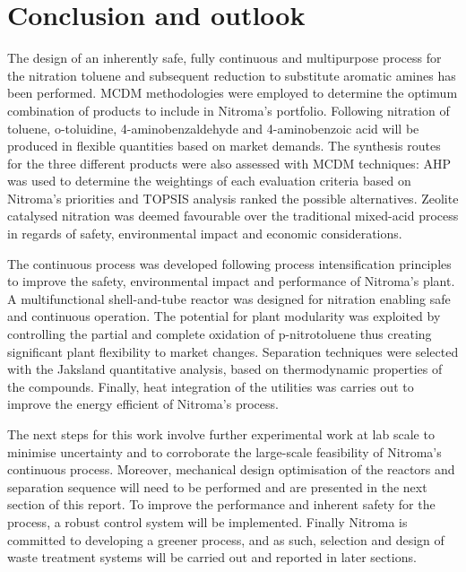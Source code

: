 \section{Conclusion and outlook}

The design of an inherently safe, fully continuous and multipurpose process for the nitration toluene and subsequent reduction to substitute aromatic amines has been performed. MCDM methodologies were employed to determine the optimum combination of products to include in Nitroma's portfolio. Following nitration of toluene, o-toluidine, 4-aminobenzaldehyde and 4-aminobenzoic acid will be produced in flexible quantities based on market demands. The synthesis routes for the three different products were also assessed with MCDM techniques: AHP was used to determine the weightings of each evaluation criteria based on Nitroma's priorities and TOPSIS analysis ranked the possible alternatives. Zeolite catalysed nitration was deemed favourable over the traditional mixed-acid process in regards of safety, environmental impact and economic considerations. 

The continuous process was developed following process intensification principles to improve the safety, environmental impact and performance of Nitroma's plant. A multifunctional shell-and-tube reactor was designed for nitration enabling safe and continuous operation. The potential for plant modularity was exploited by controlling the partial and complete oxidation of p-nitrotoluene thus creating significant plant flexibility to market changes. Separation techniques were selected with the Jaksland quantitative analysis, based on thermodynamic properties of the compounds. Finally, heat integration of the utilities was carries out to improve the energy efficient of Nitroma's process.


The next steps for this work involve further experimental work at lab scale to minimise uncertainty and to corroborate the large-scale feasibility of Nitroma's continuous process. Moreover, mechanical design optimisation of the reactors and separation sequence will need to be performed and are presented in the next section of this report. To improve the performance and inherent safety for the process, a robust control system will be implemented. Finally Nitroma is committed to developing a greener process, and as such, selection and design of waste treatment systems will be carried out and reported in later sections.